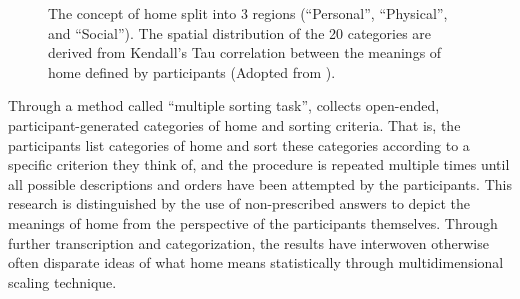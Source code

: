 \begin{figure}[H]
  \begin{minipage}{\textwidth}
    \centering
    \hspace*{.2in}
    \caption{The concept of home split into 3 regions (``Personal'', ``Physical'', and ``Social''). The spatial distribution of the 20 categories are derived from Kendall's Tau correlation between the meanings of home defined by participants  (Adopted from \textcite{sixsmith1986meaning}).}
    \label{fig:home_regions}
  \end{minipage}
\end{figure}

Through a method called ``multiple sorting task'', \textcite{sixsmith1986meaning} collects open-ended, participant-generated categories of home and sorting criteria. That is, the participants list categories of home and sort these categories according to a specific criterion they think of, and the procedure is repeated multiple times until all possible descriptions and orders have been attempted by the participants. This research is distinguished by the use of non-prescribed answers to depict the meanings of home from the perspective of the participants themselves. Through further transcription and categorization, the results have interwoven otherwise often disparate ideas of what home means statistically through multidimensional scaling technique.

